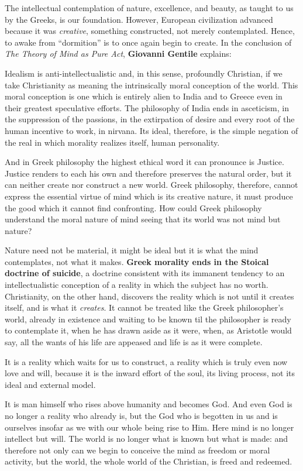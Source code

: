 The intellectual contemplation of nature, excellence, and beauty, as taught to us by the Greeks, is our foundation. However, European civilization advanced because it was \emph{creative}, something constructed, not merely contemplated. Hence, to awake from ``dormition'' is to once again begin to create. In the conclusion of \emph{The Theory of Mind as Pure Act}, \textbf{Giovanni Gentile} explains:

\begin{quotationx}
Idealism is anti-intellectualistic and, in this sense, profoundly Christian, if we take Christianity as meaning the intrinsically moral conception of the world. This moral conception is one which is entirely alien to India and to Greece even in their greatest speculative efforts. The philosophy of India ends in asceticism, in the suppression of the passions, in the extirpation of desire and every root of the human incentive to work, in nirvana. Its ideal, therefore, is the simple negation of the real in which morality realizes itself, human personality.

And in Greek philosophy the highest ethical word it can pronounce is Justice. Justice renders to each his own and therefore preserves the natural order, but it can neither create nor construct a new world. Greek philosophy, therefore, cannot express the essential virtue of mind which is its creative nature, it must produce the good which it cannot find confronting. How could Greek philosophy understand the moral nature of mind seeing that its world was not mind but nature?

Nature need not be material, it might be ideal but it is what the mind contemplates, not what it makes. \textbf{Greek morality ends in the Stoical doctrine of suicide}, a doctrine consistent with its immanent tendency to an intellectualistic conception of a reality in which the subject has no worth. Christianity, on the other hand, discovers the reality which is not until it creates itself, and is what it \emph{creates}. It cannot be treated like the Greek philosopher's world, already in existence and waiting to be known til the philosopher is ready to contemplate it, when he has drawn aside as it were, when, as Aristotle would say, all the wants of his life are appeased and life is as it were complete.

It is a reality which waits for us to construct, a reality which is truly even now love and will, because it is the inward effort of the soul, its living process, not its ideal and external model.

It is man himself who rises above humanity and becomes God. And even God is no longer a reality who already is, but the God who is begotten in us and is ourselves insofar as we with our whole being rise to Him. Here mind is no longer intellect but will. The world is no longer what is known but what is made: and therefore not only can we begin to conceive the mind as freedom or moral activity, but the world, the whole world of the Christian, is freed and redeemed.
\end{quotationx}



